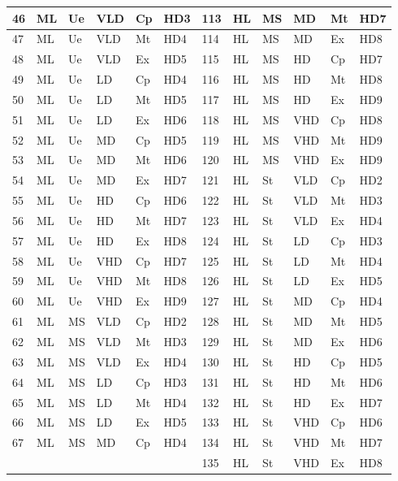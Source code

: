 \documentclass[graybox]{svmult}
\begin{document}
\begin{table}
{\begin{tabular}{ |p{1cm}|p{1cm}|p{1cm}|p{1cm}|p{1cm}|p{1cm}|p{1cm}|p{1cm}|p{1cm}|p{1cm}|p{1cm}|p{1cm}|   }
46	&	ML	&	Ue	&	VLD	&	Cp	&	HD3	&	113	&	HL	&	MS	&	MD	&	Mt	&	HD7	\\\hline
47	&	ML	&	Ue	&	VLD	&	Mt	&	HD4	&	114	&	HL	&	MS	&	MD	&	Ex	&	HD8	\\\hline
48	&	ML	&	Ue	&	VLD	&	Ex	&	HD5	&	115	&	HL	&	MS	&	HD	&	Cp	&	HD7	\\\hline
49	&	ML	&	Ue	&	LD	&	Cp	&	HD4	&	116	&	HL	&	MS	&	HD	&	Mt	&	HD8	\\\hline
50	&	ML	&	Ue	&	LD	&	Mt	&	HD5	&	117	&	HL	&	MS	&	HD	&	Ex	&	HD9	\\\hline
51	&	ML	&	Ue	&	LD	&	Ex	&	HD6	&	118	&	HL	&	MS	&	VHD	&	Cp	&	HD8	\\\hline
52	&	ML	&	Ue	&	MD	&	Cp	&	HD5	&	119	&	HL	&	MS	&	VHD	&	Mt	&	HD9	\\\hline
53	&	ML	&	Ue	&	MD	&	Mt	&	HD6	&	120	&	HL	&	MS	&	VHD	&	Ex	&	HD9	\\\hline
54	&	ML	&	Ue	&	MD	&	Ex	&	HD7	&	121	&	HL	&	St	&	VLD	&	Cp	&	HD2	\\\hline
55	&	ML	&	Ue	&	HD	&	Cp	&	HD6	&	122	&	HL	&	St	&	VLD	&	Mt	&	HD3	\\\hline
56	&	ML	&	Ue	&	HD	&	Mt	&	HD7	&	123	&	HL	&	St	&	VLD	&	Ex	&	HD4	\\\hline
57	&	ML	&	Ue	&	HD	&	Ex	&	HD8	&	124	&	HL	&	St	&	LD	&	Cp	&	HD3	\\\hline
58	&	ML	&	Ue	&	VHD	&	Cp	&	HD7	&	125	&	HL	&	St	&	LD	&	Mt	&	HD4	\\\hline
59	&	ML	&	Ue	&	VHD	&	Mt	&	HD8	&	126	&	HL	&	St	&	LD	&	Ex	&	HD5	\\\hline
60	&	ML	&	Ue	&	VHD	&	Ex	&	HD9	&	127	&	HL	&	St	&	MD	&	Cp	&	HD4	\\\hline
61	&	ML	&	MS	&	VLD	&	Cp	&	HD2	&	128	&	HL	&	St	&	MD	&	Mt	&	HD5	\\\hline
62	&	ML	&	MS	&	VLD	&	Mt	&	HD3	&	129	&	HL	&	St	&	MD	&	Ex	&	HD6	\\\hline
63	&	ML	&	MS	&	VLD	&	Ex	&	HD4	&	130	&	HL	&	St	&	HD	&	Cp	&	HD5	\\\hline
64	&	ML	&	MS	&	LD	&	Cp	&	HD3	&	131	&	HL	&	St	&	HD	&	Mt	&	HD6	\\\hline
65	&	ML	&	MS	&	LD	&	Mt	&	HD4	&	132	&	HL	&	St	&	HD	&	Ex	&	HD7	\\\hline
66	&	ML	&	MS	&	LD	&	Ex	&	HD5	&	133	&	HL	&	St	&	VHD	&	Cp	&	HD6	\\\hline
67	&	ML	&	MS	&	MD	&	Cp	&	HD4	&	134	&	HL	&	St	&	VHD	&	Mt	&	HD7	\\\hline
	&		&		&		&		&		&	135	&	HL	&	St	&	VHD	&	Ex	&	HD8	\\\hline
		
	\end{tabular}}
\end{table}			
\end{document}
